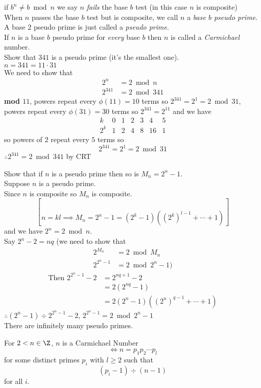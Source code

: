 if $b^n\neq b\bmod n$ we say $n$ \emph{fails} the base $b$ test (in this case $n$ is composite) \\
When $n$ passes the base $b$ test but is composite, we call $n$ a \emph{base\/ $b$ pseudo prime}. \\
A base $2$ pseudo prime is just called a \emph{pseudo prime}. \\
If $n$ is a base $b$ pseudo prime for \emph{every} base $b$ then $n$ is called a \emph{Carmichael} number. \\
\eg Show that $341$ is a pseudo prime (it's the smallest one). \\
\soln $n=341=11\cdot31$ \\
We need to show that
\begin{align*}
2^n &= 2 \bmod n \\
2^{341} &= 2 \bmod 341
\end{align*}
\textbf{mod $11$}, powers repeat every $\phi(11)=10$ terms so $2^{341}=2^1=2\bmod31$, powers repeat every $\phi(31)=30$ terms so $2^{341}=2^{11}$ and we have
\[ \begin{array}{c|cccccc}
k & 0 & 1 & 2 & 3 & 4 & 5 \\ \hline
2^k & 1 & 2 & 4 & 8 & 16 & 1
\end{array} \]
so powers of $2$ repeat every $5$ terms so
\[ 2^{341} = 2^1 = 2 \bmod 31 \]
$\therefore 2^{341}=2 \bmod 341$ by CRT

\eg Show that if $n$ is a pseudo prime then so is $M_n=2^n-1$. \\
\soln Suppose $n$ is a pseudo prime. \\
Since $n$ is composite so $M_n$ is composite.
\[ \brack{n=kl \implies M_n = 2^n - 1 = (2^k-1)((2^k)^{l-1}+\dotsb+1) } \]
and we have $2^n=2\bmod n$. \\
Say $2^n-2=nq$ (we need to show that
\begin{align*}
2^{M_n} &= 2 \bmod M_n \\
2^{2^n-1} &= 2 \bmod 2^n-1 )
\end{align*}
\begin{align*}
\text{Then } 2^{2^n-1}-2 &= 2^{nq+1} - 2 \\
&= 2(2^{nq}-1) \\
&= 2(2^n-1)((2^n)^{q-1}+\dotsb+1)
\end{align*}
$\therefore(2^n-1)\div2^{2^n-1}-2$, $2^{2^n-1}=2\bmod 2^n-1$ \\
\cor There are infinitely many pseudo primes.

For $2<n\in\Z$, $n$ is a Carmichael Number
\[ \iff n = p_1 p_2 \dotsm p_l \]
for some distinct primes $p_i$ with $l\geq2$ such that
\[  (p_i-1) \div (n-1) \]
for all $i$.
